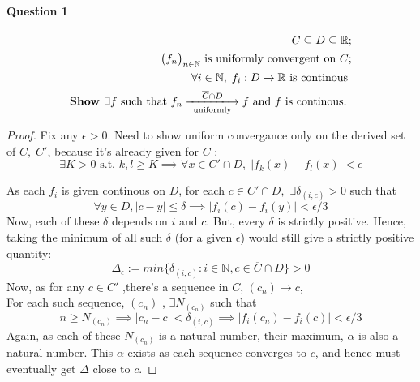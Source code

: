 \documentclass[20pt,a4paper]{extarticle} %
\begin{document}
\paragraph{Question 1}
\begin{eqnarray*}
	C \subseteq D \subseteq \mathbb{R};\\
	\big(f _n\big)_{n \in \mathbb{N}} \text{ is uniformly convergent on } C ;\\
	\forall i \in \mathbb{N} , \; f_i : D \xrightarrow{} \mathbb{R} \text{ is continous }\\
	\textbf{Show } \exists f \text{ such that } f_n \xlongrightarrow [ \text{ uniformly }]{ \overline{C} \cap D } f
	\text{ and } f \text{ is continous. }
\end{eqnarray*}
\begin{proof}

	Fix any $\epsilon > 0$. Need to show uniform convergance only on the derived set of $C,\; C'$,
	because it's already given for $C$ :
	\[ \exists K >0 \text{ s.t. } k,l\geq K \implies \forall x \in C' \cap D, \;
	|f_k(x) - f_l(x) |< \epsilon\]

	As each $f_i$ is given continous on $D$, for each $c \in C' \cap D,$
	$ \exists \delta_{(i,c)} >0 $ such that
	\[ \forall y \in D, |c-y| \leq \delta \implies |f_i(c) - f_i(y)| < \epsilon/3  \]
	Now, each of these $\delta$ depends on $i$ and $c$. But, every $\delta$ is strictly positive.
	Hence, taking the minimum of all such $\delta$ (for a given $\epsilon$) would still give a
	strictly positive quantity:
	\[ \Delta_\epsilon := min\{\delta_{(i,c)}:  i \in \mathbb{N}, c \in \overline{C} \cap D\} > 0 \]
	Now, as for any $c \in C'$ ,there's a sequence in $C$, $(c_n) \rightarrow c$, \\
	For each such sequence, $(c_n)$ , $\exists N_{(c_n)}$ such that
	\[ n \geq N_{(c_n)} \implies |c_n - c| < \delta_{(i,c)}	\implies |f_i(c_n) - f_i(c)| < \epsilon/3 \]
	Again, as each of these $N_{(c_n)}$ is a natural number, their maximum, $\alpha$ is also a natural number.
	 This $\alpha$ exists as each sequence converges to $c$, and hence must eventually get $\Delta$ close to $c$.


\end{proof}
\end{document}
